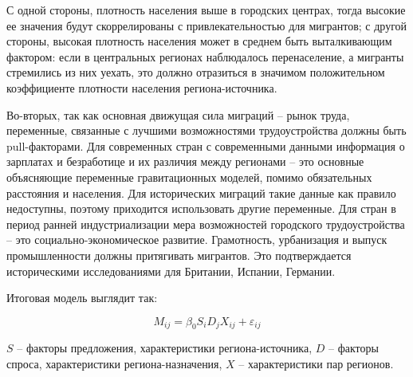 \documentclass[a4paper,12pt]{article}
\begin{document}
С одной стороны, плотность населения выше в городских центрах, тогда высокие ее значения будут скоррелированы с привлекательностью для мигрантов; с другой стороны, высокая плотность населения может в среднем быть выталкивающим фактором: если в центральных регионах наблюдалось перенаселение, а мигранты стремились из них уехать, это должно отразиться в значимом положительном коэффициенте плотности населения региона-источника.


Во-вторых, так как основная движущая сила миграций – рынок труда, переменные, связанные с лучшими возможностями трудоустройства должны быть pull-факторами. Для современных стран с современными данными информация о зарплатах и безработице и их различия между регионами – это основные объясняющие переменные гравитационных моделей, помимо обязательных расстояния и населения. Для исторических миграций такие данные как правило недоступны, поэтому приходится использовать другие переменные. Для стран в период ранней индустриализации мера возможностей городского трудоустройства – это социально-экономическое развитие. Грамотность, урбанизация и выпуск промышленности должны притягивать мигрантов. Это подтверждается историческими исследованиями для Британии, Испании, Германии. \citep{ silvestre_internal_2005, hochstadt_migration_1981, nicholas_internal_1987}

Итоговая модель выглядит так:

\begin{equation}\label{eq:extended}
	M_{ij} = \beta_0 S_{i} D_{j} X_{ij} + \varepsilon_{ij}
\end{equation}

$S$ – факторы предложения, характеристики региона-источника, $D$ – факторы спроса, характеристики региона-назначения, $X$ – характеристики пар регионов.
\end{document}
